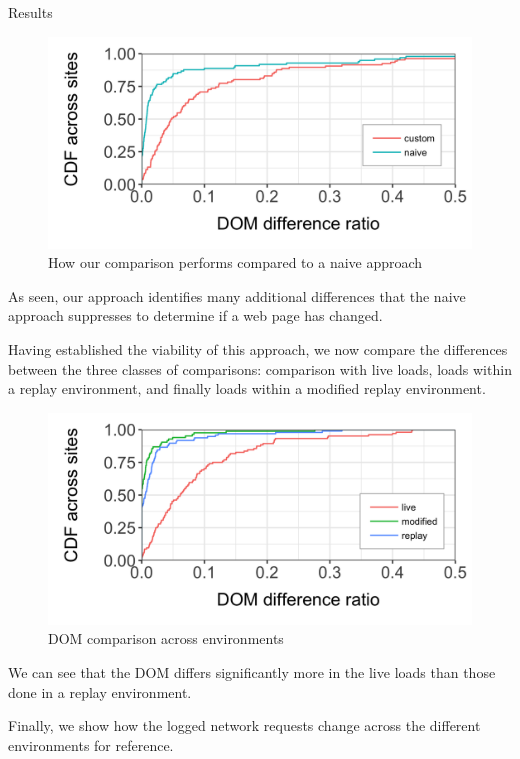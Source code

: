 \documentclass[final]{beamer}
\newlength{\onecolwid}
\begin{document}
\begin{frame}[t]
\begin{columns}[t]
\begin{column}{\onecolwid}
\begin{block}{Results}
\begin{figure}
\vspace{0.5cm}
\includegraphics[width=0.8\linewidth]{naive_comparison_plot.png}
\vspace{-1.5cm}
\caption{How our comparison performs compared to a naive approach}
\end{figure}

As seen, our approach identifies many additional differences that the naive approach suppresses to determine if a web page has changed. 

Having established the viability of this approach, we now compare the differences between the three classes of comparisons: comparison with live loads, loads within a replay environment, and finally loads within a modified replay environment.

\begin{figure}
\vspace{0.5cm}
\includegraphics[width=0.8\linewidth]{dom_plot.png}
\vspace{-1.5cm}
\caption{DOM comparison across environments}
\end{figure}

We can see that the DOM differs significantly more in the live loads than those done in a replay environment.

Finally, we show how the logged network requests change across the different environments for reference.


\end{block}
\end{column}
\end{columns}
\end{frame}
\end{document}
